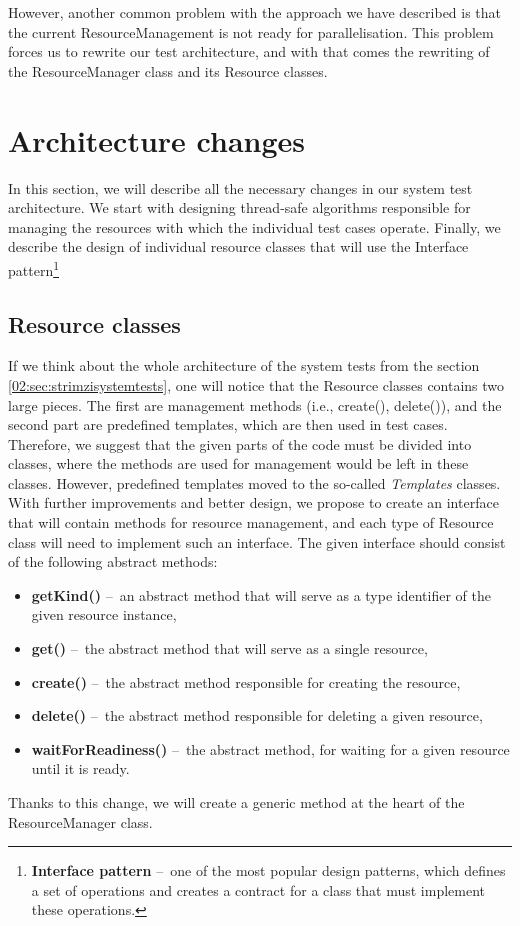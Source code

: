 However, another common problem with the approach we have described is that the current ResourceManagement is not ready for parallelisation.
This problem forces us to rewrite our test architecture, and with that comes the rewriting of the ResourceManager class and its Resource classes.

\section{Architecture changes}
\label{04:architecturechanges}

In this section, we will describe all the necessary changes in our system test architecture.
We start with designing thread-safe algorithms responsible for managing the resources with which the individual test cases operate.
Finally, we describe the design of individual resource classes that will use the Interface pattern\footnote{\textbf{Interface pattern} \---\ one of the most popular design patterns, which defines a set of operations and creates a contract for a class that must implement these operations.}

\subsection{Resource classes}

If we think about the whole architecture of the system tests from the section \ref{02:sec:strimzisystemtests}, one will notice that the Resource classes contains two large pieces.
The first are management methods (i.e., create(), delete()), and the second part are predefined templates, which are then used in test cases.
Therefore, we suggest that the given parts of the code must be divided into classes, where the methods are used for management would be left in these classes.
However, predefined templates moved to the so-called \emph{Templates} classes.
With further improvements and better design, we propose to create an interface that will contain methods for resource management, and each type of Resource class will need to implement such an interface.
The given interface should consist of the following abstract methods:
\begin{itemize}[itemsep = 1mm, parsep = 0pt]
    \item \textbf {getKind()} \---\ an abstract method that will serve as a type identifier of the given resource instance,
    \item \textbf {get()} \---\ the abstract method that will serve as a single resource,
    \item \textbf {create()} \---\ the abstract method responsible for creating the resource,
    \item \textbf {delete()} \---\ the abstract method responsible for deleting a given resource,
    \item \textbf {waitForReadiness()} \---\ the abstract method, for waiting for a given resource until it is ready.
\end{itemize}
Thanks to this change, we will create a generic method at the heart of the ResourceManager class.

